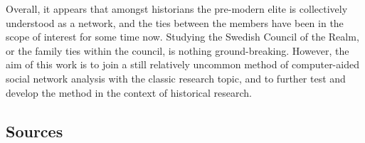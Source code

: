 \documentclass[a4paper,12pt]{article}
\begin{document}
 Overall, it appears that amongst historians the pre-modern elite is collectively understood as a network, and the ties between the members have been in the scope of interest for some time now. Studying the Swedish Council of the Realm, or the family ties within the council, is nothing ground-breaking. However, the aim of this work is to join a still relatively uncommon method of computer-aided social network analysis with the classic research topic, and to further test and develop the method in the context of historical research. 

\subsection{Sources}
\end{document}

